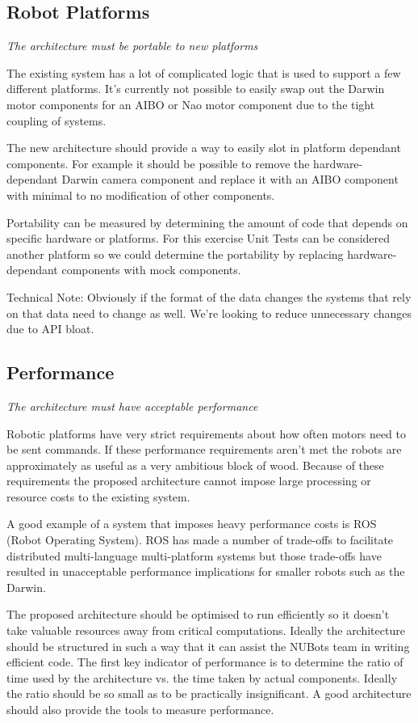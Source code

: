 \documentclass[english,12pt]{scrartcl}
\newcommand{\requirement}[1]{\textit{#1}}
\begin{document}
		\subsection{Robot Platforms}
			\requirement{The architecture must be portable to new platforms}

			The existing system has a lot of complicated logic that is used to support a few
			different platforms. It's currently not possible to easily swap out the Darwin motor
			components for an AIBO or Nao motor component due to the tight coupling of systems.

			The new architecture should provide a way to easily slot in platform dependant
			components. For example it should be possible to remove the hardware-dependant Darwin
			camera component and replace it with an AIBO component with minimal to no modification
			of other components.

			Portability can be measured by determining the amount of code that depends on specific
			hardware or platforms. For this exercise Unit Tests can be considered another platform
			so we could determine the portability by replacing hardware-dependant components with
			mock components.

			Technical Note: Obviously if the format of the data changes the systems that rely on
			that data need to change as well. We're looking to reduce unnecessary changes due to API
			bloat.

		\subsection{Performance}
			\requirement{The architecture must have acceptable performance}

			Robotic platforms have very strict requirements about how often motors need to be sent
			commands. If these performance requirements aren't met the robots are approximately as
			useful as a very ambitious block of wood. Because of these requirements the proposed
			architecture cannot impose large processing or resource costs to the existing system.

			A good example of a system that imposes heavy performance costs is ROS (Robot Operating
			System). ROS has made a number of trade-offs to facilitate distributed multi-language
			multi-platform systems but those trade-offs have resulted in unacceptable performance
			implications for smaller robots such as the Darwin.

			The proposed architecture should be optimised to run efficiently so it doesn't take
			valuable resources away from critical computations. Ideally the architecture should be
			structured in such a way that it can assist the NUBots team in writing efficient code.
			The first key indicator of performance is to determine the ratio of time used by the
			architecture vs. the time taken by actual components. Ideally the ratio should be so
			small as to be practically insignificant. A good architecture should also provide the
			tools to measure performance.
\end{document}
